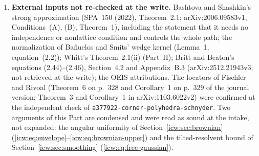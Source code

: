 \documentclass[11pt,letterpaper]{article}
\theoremstyle{remark}\newtheorem{remark}[theorem]{Remark}
\newcommand{\1}{\mathbf1}
\newcommand{\file}[1]{\textup{\nolinkurl{#1}}}
\begin{document}
\begin{enumerate}[label=\arabic*.,ref=\arabic*]
\item\label{icw:q:external} \textbf{External inputs not re-checked at the write.} Bashtova and Shashkin's strong approximation (SPA~150 (2022), Theorem~2.1; arXiv:2006.09583v1, Conditions~(A), (B), Theorem~1), including the statement that it needs no independence or nonlattice condition and controls the whole path; the normalization of Ba\~nuelos and Smits' wedge kernel (Lemma~1, equation~(2.2)); Whitt's Theorem~2.1(ii) (Part~II); Britt and Beaton's equations (2.44)--(2.46), Section~4.2 and Appendix~B.3 (arXiv:2512.21943v3; not retrieved at the write); the OEIS attributions. The locators of Fischler and Rivoal (Theorem~6 on p.~328 and Corollary~1 on p.~329 of the journal version; Theorem~3 and Corollary~1 in arXiv:1103.6022v2) were confirmed at the independent check of \file{a377922-corner-polyhedra-schnyder}. Two arguments of this Part are condensed and were read as sound at the intake, not expanded: the angular uniformity of Section~\ref{icw:sec:brownian} (\eqref{icw:eq:envelope}--\eqref{icw:eq:brownian-upper}) and the tilted-resolvent bound of Section~\ref{icw:sec:smoothing} (\eqref{icw:eq:free-gaussian}).
\end{enumerate}

\clearpage
\end{document}
